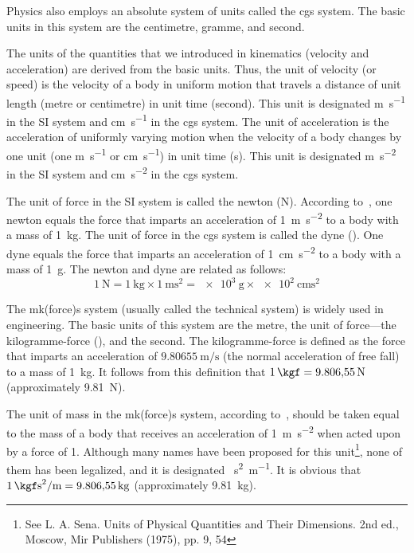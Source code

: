 Physics also employs an absolute system of units called the cgs system. The basic units in this system are the centimetre, gramme, and second.

The units of the quantities that we introduced in kinematics (velocity and acceleration) are derived from the basic units. Thus, the unit of velocity (or speed) is the velocity of a body in uniform motion that travels a distance of unit length (metre or centimetre) in unit time (second). This unit is designated \si{\metre\per\second} in the SI system and \si{\centi\metre\per\second} in the cgs system. The unit of acceleration is the acceleration of uniformly varying motion when the velocity of a body changes by one unit (one \si{\metre\per\second} or \si{\centi\metre\per\second}) in unit time (\si{\second}). This unit is designated \si{\metre\per\square\second} in the SI system and \si{\centi\metre\per\square\second} in the cgs system.

The unit of force in the SI system is called the newton (\si{\newton}). According to~, one newton equals the force that imparts an acceleration of \SI{1}{\metre\per\square\second} to a body with a mass of \SI{1}{\kilo\gram}. The unit of force in the cgs system is called the dyne (\si{\dyne}). One dyne equals the force that imparts an acceleration of \SI{1}{\centi\metre\per\square\second} to a body with a mass of \SI{1}{\gram}. The newton and dyne are related as follows:
\begin{equation*}
\SI{1}{\newton} = \SI{1}{\kilo\gram} \times \SI{1}{\metre\square\second} = \SI{e3}{\gram} \times \SI{e2}{\centi\metre\square\second}
\end{equation*}

The mk(force)s system (usually called the technical system) is widely used in engineering. The basic units of this system are the metre, the unit of force---the kilogramme-force (\si{\kgf}), and the second. The kilogramme-force is defined as the force that imparts an acceleration of $\SI{9.80655}{\metre\per\second}$ (the normal acceleration of free fall) to a mass of \SI{1}{\kilo\gram}. It follows from this definition that $\SI{1}{\kgf}=\SI{9.80655}{\newton}$ (approximately \SI{9.81}{\newton}).

The unit of mass in the mk(force)s system, according to~, should be taken equal to the mass of a body that receives an acceleration of \SI{1}{\metre\per\square\second} when acted upon by a force of \SI{1}{\kgf}. Although many names have been proposed for this unit\footnote{See L. A. Sena. Units of Physical Quantities and Their Dimensions. 2nd ed., Moscow, Mir Publishers (1975), pp. 9, 54}, none of them has been legalized, and it is designated \si{\kgf\second\squared\per\metre}. It is obvious that $\SI{1}{\kgf\second\squared\per\metre}=\SI{9.80655}{\kilo\gram}$ (approximately \SI{9.81}{\kilo\gram}).

